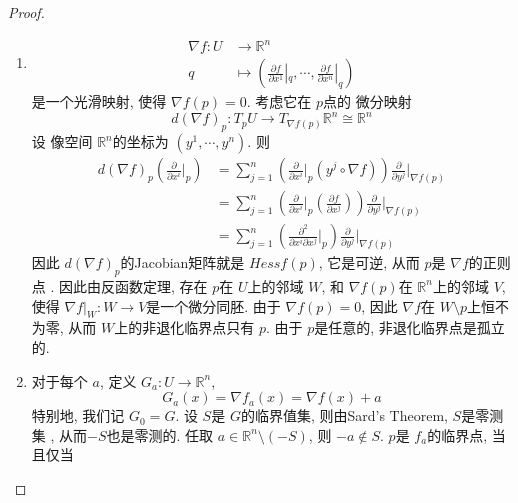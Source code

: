 \documentclass[../main.tex]{subfiles}
\begin{document}
\begin{proof}
    \begin{enumerate}
        \item [a).]  \[
        \begin{aligned}
         \nabla f: U&\to \mathbb{R} ^{n}\\ 
          q&\mapsto  \left( \frac{\partial f}{\partial x^{1}}|_{q},\cdots ,\frac{\partial f}{\partial x^{n}}|_{q} \right)  
        \end{aligned}
        \]是一个光滑映射, 使得 \(   \nabla f\left( p \right)= 0   \). 考虑它在 \(  p  \)点的 微分映射 \[
        d\left(  \nabla f \right)_{p} : T_{p}U\to T_{\nabla f(p)} \mathbb{R}^n \cong \mathbb{R}^n 
        \]  设 像空间 \(  \mathbb{R} ^{n}  \)的坐标为 \(  \left( y^{1},\cdots ,y^{n} \right)   \). 则 \[
        \begin{aligned}
        d\left(  \nabla f \right)_{p}\left( \frac{\partial }{\partial x^{i}}|_{p} \right)&= \sum _{j = 1}^{n} \left( \frac{\partial }{\partial x^{i}}|_{p} \left( y^{j}\circ  \nabla f \right)  \right) \frac{\partial }{\partial y^{j}}|_{ \nabla f\left( p \right) }   \\ 
         &= \sum _{j = 1}^{n}\left( \frac{\partial }{\partial x^{i}}|_{p}\left( \frac{\partial f}{\partial x^{j}} \right)  \right) \frac{\partial }{\partial y^{j}}|_{ \nabla f\left( p \right) }  \\ 
         &= \sum _{j = 1}^{n} \left( \frac{\partial ^{2}}{\partial x^{i} \partial x^{j}}|_{p} \right) \frac{\partial }{\partial y^{j}}|_{ \nabla f\left( p \right) } 
        \end{aligned}
        \] 因此 \(  d\left(  \nabla f \right)_{p}   \)的Jacobian矩阵就是 \(  Hess f\left( p \right)   \), 它是可逆, 从而 \(  p  \)是 \(   \nabla f  \)的正则点  . 因此由反函数定理, 存在 \(  p  \)在 \(  U  \)上的邻域 \(  W  \), 和 \(   \nabla f\left( p \right)   \)在 \(  \mathbb{R} ^{n}  \)上的邻域 \(  V  \), 使得 \(   \nabla f|_{W}: W\to V  \)是一个微分同胚. 由于 \(   \nabla f\left( p \right)= 0   \), 因此 \(   \nabla f  \)在 \(  W\setminus p  \)上恒不为零, 从而 \(  W  \)上的非退化临界点只有 \(  p  \). 由于 \(  p  \)是任意的, 非退化临界点是孤立的.        
        \item [b).]  对于每个 \(  a  \),  定义 \(  G_{a}:U\to \mathbb{R} ^{n}  \), \[
        G_{a}\left( x \right)=  \nabla f_{a}\left( x \right)=  \nabla f\left( x \right)+ a   
        \] 特别地, 我们记 \(  G_{0}= G  \).   设 \(  S  \)是 \(  G  \)的临界值集, 则由Sard's Theorem,  \(  S  \)是零测集 ,    从而\(  -S  \)也是零测的.    任取 \(  a \in \mathbb{R} ^{n}\setminus \left( -S \right)   \), 则 \(  -a \not \in S  \).  \(  p  \)是 \(  f_{a}  \)的临界点, 当且仅当\[
\]
\end{enumerate}
\end{proof}
\end{document}
